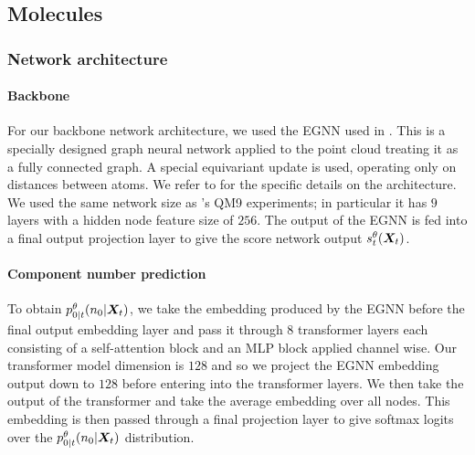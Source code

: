 \subsection{Molecules}

\subsubsection{Network architecture}
\paragraph{Backbone}
For our backbone network architecture, we used the EGNN used in \citet{hoogeboom2022equivariant}. This is a specially designed graph neural network applied to the point cloud treating it as a fully connected graph. A special equivariant update is used, operating only on distances between atoms. We refer to \citet{hoogeboom2022equivariant} for the specific details on the architecture. We used the same network size as \citet{hoogeboom2022equivariant}'s QM9 experiments; in particular it has $9$ layers with a hidden node feature size of $256$. The output of the EGNN is fed into a final output projection layer to give the score network output $s_t^\theta({\bm{X}}_t)$.

\paragraph{Component number prediction}
To obtain $p_{0|t}^\theta(n_0 | {\bm{X}}_t)$,  we take the embedding produced by the EGNN before the final output embedding layer and pass it through 8 transformer layers each consisting of a self-attention block and an MLP block applied channel wise. Our transformer model dimension is $128$ and so we project the EGNN embedding output down to $128$ before entering into the transformer layers. We then take the output of the transformer and take the average embedding over all nodes. This embedding is then passed through a final projection layer to give softmax logits over the $p_{0|t}^\theta(n_0 | {\bm{X}}_t)$ distribution.

